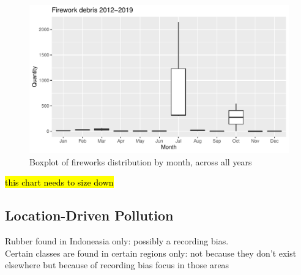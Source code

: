 \documentclass[10pt]{article}\usepackage[]{graphicx}\usepackage[]{color}
\newenvironment{knitrout}{}{} %
\begin{document}
\begin{figure}[H] %
\begin{center}
\begin{knitrout}
\color{fgcolor}
\includegraphics[width=1\linewidth]{figure/unnamed-chunk-13-1} 

\end{knitrout}

\caption {Boxplot of fireworks distribution by month, across all years}
\label{figA}
\end {center}
\end {figure}
\hl{this chart needs to size down}





\subsection{Location-Driven Pollution}

Rubber found in Indoneasia only: possibly a recording bias.\\

Certain classes are found in certain regions only: not because they don't exist elsewhere but because of recording bias focus in those areas\\
\end{document}

